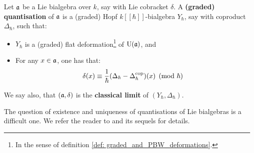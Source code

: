         \begin{definition}[Quantisations] \label{def: quantisations}
            Let $\mathfrak{a}$ be a Lie bialgebra over $k$, say with Lie cobracket $\delta$. A \textbf{(graded) quantisation} of $\mathfrak{a}$ is a (graded) Hopf $k[\![\hbar]\!]$-bialgebra $Y_{\hbar}$, say with coproduct $\Delta_{\hbar}$, such that:
            \begin{itemize}
                \item $Y_{\hbar}$ is a (graded) flat deformation\footnote{In the sense of definition \ref{def: graded_and_PBW_deformations}.} of $\mathrm{U}(\mathfrak{a})$, and
                \item For any $x \in \mathfrak{a}$, one has that:
                    $$\delta(x) \equiv \frac{1}{\hbar}(\Delta_{\hbar} - \Delta_{\hbar}^{\mathrm{cop}})(x) \pmod{\hbar}$$
            \end{itemize}
            We say also, that $(\mathfrak{a}, \delta)$ is the \textbf{classical limit} of $(Y_{\hbar}, \Delta_{\hbar})$. 
        \end{definition}
        \begin{remark}
            The question of existence and uniqueness of quantisations of Lie bialgebras is a difficult one. We refer the reader to \cite{etingof_kazhdan_quantisation_1} and its sequels for details.
        \end{remark}

